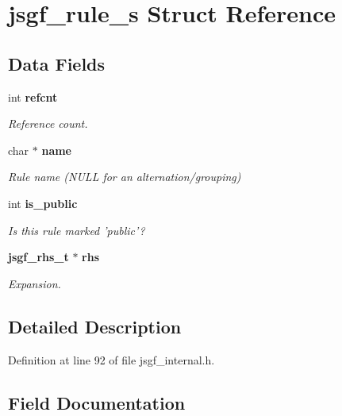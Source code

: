 \section{jsgf\-\_\-rule\-\_\-s Struct Reference}
\label{structjsgf__rule__s}
\subsection*{Data Fields}
\begin{DoxyCompactItemize}
\item 
int {\bf refcnt}
\begin{DoxyCompactList}\small\item\em Reference count. \end{DoxyCompactList}\item 
char $\ast$ {\bf name}\label{structjsgf__rule__s_a1b1de5afa4c0f27df4e8d51ebc47ca92}

\begin{DoxyCompactList}\small\item\em Rule name (N\-U\-L\-L for an alternation/grouping) \end{DoxyCompactList}\item 
int {\bf is\-\_\-public}\label{structjsgf__rule__s_a36478d9850594d6a201c6724ec1f1fa4}

\begin{DoxyCompactList}\small\item\em Is this rule marked 'public'? \end{DoxyCompactList}\item 
{\bf jsgf\-\_\-rhs\-\_\-t} $\ast$ {\bf rhs}\label{structjsgf__rule__s_a6923b74ad72f8b663cc00dfa99490981}

\begin{DoxyCompactList}\small\item\em Expansion. \end{DoxyCompactList}\end{DoxyCompactItemize}


\subsection{Detailed Description}


Definition at line 92 of file jsgf\-\_\-internal.\-h.



\subsection{Field Documentation}
